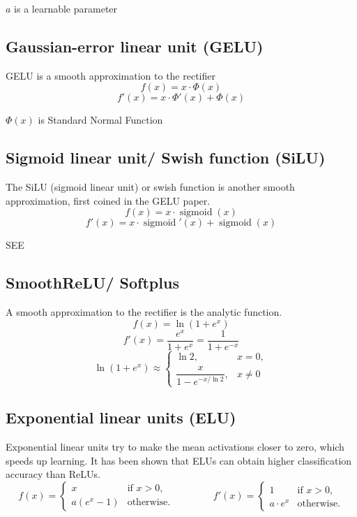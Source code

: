 $a$ is a learnable parameter

\subsection{Gaussian-error linear unit (GELU)}\label{Gaussian-error linear unit (GELU)}
GELU is a smooth approximation to the rectifier
\[
    f(x)=x\cdot \Phi (x)
\]
\[
    f'(x)=x\cdot \Phi '(x)+\Phi (x)
\]

$\Phi (x)$ is Standard Normal Function


\subsection{Sigmoid linear unit/ Swish function (SiLU)}\label{Sigmoid linear unit/ Swish function (SiLU)}
The SiLU (sigmoid linear unit) or swish function is another smooth approximation, first coined in the GELU paper.
\[
    f(x)=x\cdot \operatorname {sigmoid} (x)
\]
\[
    f'(x)=x\cdot \operatorname {sigmoid} '(x)+\operatorname {sigmoid} (x)
\]

SEE 

\subsection{SmoothReLU/ Softplus \cite{wiki-Rectifier}}\label{SmoothReLU/ Softplus}
A smooth approximation to the rectifier is the analytic function.
\[ 
f(x)=\ln(1+e^{x}) 
\]
\[
f'(x)={\dfrac {e^{x}}{1+e^{x}}}={\displaystyle \dfrac {1}{1+e^{-x}}} 
\]
\[ 
    \ln \left(1+e^{x}\right)\approx {\begin{cases}\ln 2,&x=0,\\[6pt]{\displaystyle \dfrac {x}{1-e^{-x/\ln 2}}},&x\neq 0\end{cases}} 
\]

\subsection{Exponential linear units (ELU) \cite{wiki-Rectifier}}\label{Exponential linear units (ELU)}
Exponential linear units try to make the mean activations closer to zero, which speeds up learning. It has been shown that ELUs can obtain higher classification accuracy than ReLUs.
\[
    {\displaystyle f(x)={\begin{cases}x&{\text{if }}x>0,\\a\left(e^{x}-1\right)&{\text{otherwise}}.\end{cases}}\qquad \qquad f'(x)={\begin{cases}1&{\text{if }}x>0,\\a\cdot e^{x}&{\text{otherwise}}.\end{cases}}}
\]

